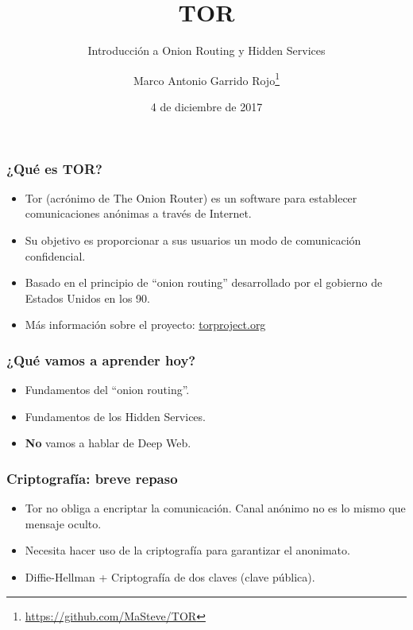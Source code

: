 \documentclass[spanish, a4paper, 12pt, final, slideColor, nototal, colorBG, pdf, noaccumulate, darkblue] {beamer}
\title{TOR}
\subtitle{Introducción a Onion Routing y Hidden Services}
\author{Marco Antonio Garrido Rojo\thanks{\url{https://github.com/MaSteve/TOR}}}
\date{4 de diciembre de 2017}
\begin{document}
\maketitle
\begin{frame}
    \frametitle{¿Qué es TOR?}
    \begin{itemize}
    \item Tor (acrónimo de The Onion Router) es un software para establecer comunicaciones anónimas a través de Internet.
    \item Su objetivo es proporcionar a sus usuarios un modo de comunicación confidencial.
    \item Basado en el principio de ``onion routing'' desarrollado por el gobierno de Estados Unidos en los 90.
    \item Más información sobre el proyecto: \url{torproject.org}
    \end{itemize}
\end{frame}
\begin{frame}
    \frametitle{¿Qué vamos a aprender hoy?}
    \begin{itemize}
    \item Fundamentos del ``onion routing''.
    \item Fundamentos de los Hidden Services.
    \item {\bf No} vamos a hablar de Deep Web.
    \end{itemize}
\end{frame}
\begin{frame}
    \frametitle{Criptografía: breve repaso}
    \begin{itemize}
    \item Tor no obliga a encriptar la comunicación. Canal anónimo no es lo mismo que mensaje oculto.
    \item Necesita hacer uso de la criptografía para garantizar el anonimato.
    \item Diffie-Hellman + Criptografía de dos claves (clave pública).
    \end{itemize}
\end{frame}
\end{document}
